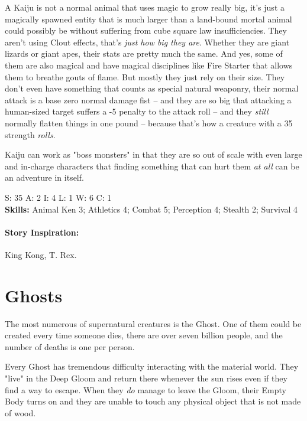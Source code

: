 A Kaiju is not a normal animal that uses magic to grow really big, it's just a magically spawned entity that is much larger than a land-bound mortal animal could possibly be without suffering from cube square law insufficiencies. They aren't using Clout effects, that's \textit{just how big they are}. Whether they are giant lizards or giant apes, their stats are pretty much the same. And yes, some of them are also magical and have magical disciplines like Fire Starter that allows them to breathe gouts of flame. But mostly they just rely on their size. They don't even have something that counts as special natural weaponry, their normal attack is a base zero normal damage fist -- and they are so big that attacking a human-sized target suffers a -5 penalty to the attack roll -- and they \textit{still} normally flatten things in one pound -- because that's how a creature with a 35 strength \textit{rolls}.

Kaiju can work as "boss monsters" in that they are so out of scale with even large and in-charge characters that finding something that can hurt them \textit{at all} can be an adventure in itself.

S: 35 A: 2 I: 4 L: 1 W: 6 C: 1\\
\textbf{Skills:} Animal Ken 3; Athletics 4; Combat 5; Perception 4; Stealth 2; Survival 4

\paragraph{Story Inspiration:} King Kong, T. Rex.

\section{Ghosts} 

The most numerous of supernatural creatures is the Ghost. One of them could be created every time someone dies, there are over seven billion people, and the number of deaths is one per person.

Every Ghost has tremendous difficulty interacting with the material world. They "live" in the Deep Gloom and return there whenever the sun rises even if they find a way to escape. When they \textit{do} manage to leave the Gloom, their Empty Body turns on and they are unable to touch any physical object that is not made of wood. 

